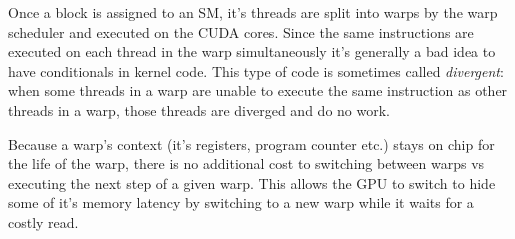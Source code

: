\documentclass[letterpaper,10pt,openany,oneside]{sphinxmanual}
\begin{document}
Once a block is assigned to an SM, it's threads are split into
warps by the warp scheduler and executed on the CUDA cores.
Since the same instructions are executed on each thread in the
warp simultaneously it's generally a bad idea to have
conditionals in kernel code.  This type of code is sometimes called \emph{divergent}:
when some threads in a warp are unable to execute the same instruction
as other threads in a warp, those threads are diverged and do no work.

Because a warp's context (it's registers, program counter etc.)
stays on chip for the life of the warp, there is no additional
cost to switching between warps vs executing the next step of a
given warp. This allows the GPU to switch to hide some of it's
memory latency by switching to a new warp while it waits for a
costly read.
\end{document}
